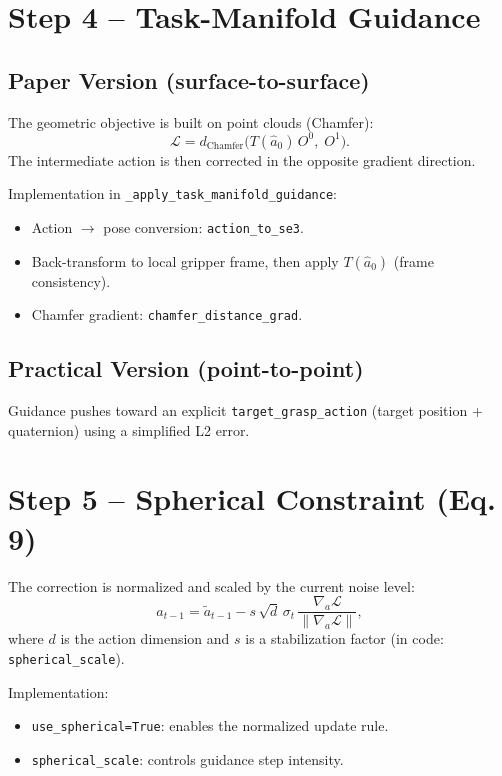 \documentclass[11pt,a4paper]{article}
\begin{document}
\section{Step 4 -- Task-Manifold Guidance}
\subsection{Paper Version (surface-to-surface)}
The geometric objective is built on point clouds (Chamfer):
\begin{equation}
\mathcal L = d_{\text{Chamfer}}\big(T(\hat a_0)\,O^0,\;O^1\big).
\end{equation}
The intermediate action is then corrected in the opposite gradient direction.

Implementation in \texttt{\_apply\_task\_manifold\_guidance}:
\begin{itemize}
\item Action $\to$ pose conversion: \texttt{action\_to\_se3}.
\item Back-transform to local gripper frame, then apply $T(\hat a_0)$ (frame consistency).
\item Chamfer gradient: \texttt{chamfer\_distance\_grad}.
\end{itemize}

\subsection{Practical Version (point-to-point)}
Guidance pushes toward an explicit \texttt{target\_grasp\_action} (target position + quaternion) using a simplified L2 error.

\section{Step 5 -- Spherical Constraint (Eq. 9)}
The correction is normalized and scaled by the current noise level:
\begin{equation}
 a_{t-1} = \tilde a_{t-1} - s\,\sqrt{d}\,\sigma_t\,\frac{\nabla_a\mathcal L}{\|\nabla_a\mathcal L\|},
\end{equation}
where $d$ is the action dimension and $s$ is a stabilization factor (in code: \texttt{spherical\_scale}).

Implementation:
\begin{itemize}
\item \texttt{use\_spherical=True}: enables the normalized update rule.
\item \texttt{spherical\_scale}: controls guidance step intensity.
\end{itemize}
\end{document}
